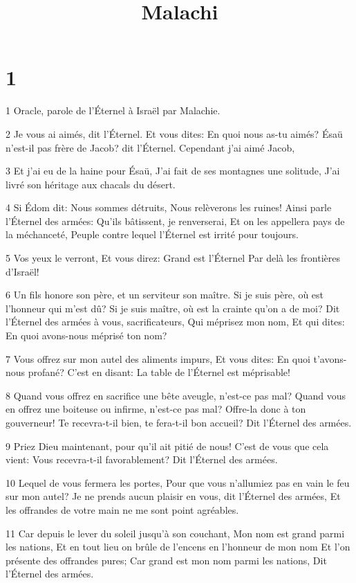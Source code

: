 

\title{Malachi}


\chapter{1}

\par 1 Oracle, parole de l'Éternel à Israël par Malachie.
\par 2 Je vous ai aimés, dit l'Éternel. Et vous dites: En quoi nous as-tu aimés? Ésaü n'est-il pas frère de Jacob? dit l'Éternel. Cependant j'ai aimé Jacob,
\par 3 Et j'ai eu de la haine pour Ésaü, J'ai fait de ses montagnes une solitude, J'ai livré son héritage aux chacals du désert.
\par 4 Si Édom dit: Nous sommes détruits, Nous relèverons les ruines! Ainsi parle l'Éternel des armées: Qu'ils bâtissent, je renverserai, Et on les appellera pays de la méchanceté, Peuple contre lequel l'Éternel est irrité pour toujours.
\par 5 Vos yeux le verront, Et vous direz: Grand est l'Éternel Par delà les frontières d'Israël!
\par 6 Un fils honore son père, et un serviteur son maître. Si je suis père, où est l'honneur qui m'est dû? Si je suis maître, où est la crainte qu'on a de moi? Dit l'Éternel des armées à vous, sacrificateurs, Qui méprisez mon nom, Et qui dites: En quoi avons-nous méprisé ton nom?
\par 7 Vous offrez sur mon autel des aliments impurs, Et vous dites: En quoi t'avons-nous profané? C'est en disant: La table de l'Éternel est méprisable!
\par 8 Quand vous offrez en sacrifice une bête aveugle, n'est-ce pas mal? Quand vous en offrez une boiteuse ou infirme, n'est-ce pas mal? Offre-la donc à ton gouverneur! Te recevra-t-il bien, te fera-t-il bon accueil? Dit l'Éternel des armées.
\par 9 Priez Dieu maintenant, pour qu'il ait pitié de nous! C'est de vous que cela vient: Vous recevra-t-il favorablement? Dit l'Éternel des armées.
\par 10 Lequel de vous fermera les portes, Pour que vous n'allumiez pas en vain le feu sur mon autel? Je ne prends aucun plaisir en vous, dit l'Éternel des armées, Et les offrandes de votre main ne me sont point agréables.
\par 11 Car depuis le lever du soleil jusqu'à son couchant, Mon nom est grand parmi les nations, Et en tout lieu on brûle de l'encens en l'honneur de mon nom Et l'on présente des offrandes pures; Car grand est mon nom parmi les nations, Dit l'Éternel des armées.
